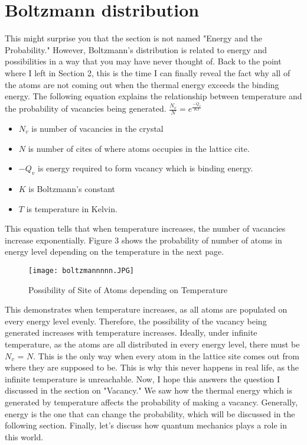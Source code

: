 \documentclass{article}
\begin{document}
\section{Boltzmann distribution}
This might surprise you that the section is not named "Energy and the Probability." 
However, Boltzmann's distribution is related to energy and possibilities in a way that you may have never thought of. 
Back to the point where I left in Section 2, this is the time I can finally reveal the fact why all of the atoms are not coming out when the thermal energy exceeds the binding energy. 
The following equation explains the relationship between temperature and the probability of vacancies being generated. 
\LARGE
$\frac{N_v}{N} = e^\frac{-Q_v}{KT}\ $     
\\
\normalsize
\begin{itemize}
    \item $ N_v$ is number of vacancies in the crystal 
    \item $ N$ is number of cites of where atoms occupies in the lattice cite. 
    \item $-Q_v$ is energy required to form vacancy which is binding energy.
    \item $K$ is Boltzmann's constant 
    \item $T$ is temperature in Kelvin. 
\end{itemize}

This equation tells that when temperature increases, the number of vacancies increase exponentially. 
Figure 3 shows the probability of number of atoms in energy level depending on the temperature in the next page.
\\
\begin{figure}
    \centering
    \texttt{[image: boltzmannnnn.JPG]}
    \caption{Possibility of Site of Atoms depending on Temperature}
    \label{fig:l}
\end{figure}
This demonstrates when temperature increases, as all atoms are populated on every energy level evenly. Therefore, the possibility of the vacancy being generated increases with temperature increases. 
Ideally, under infinite temperature, as the atoms are all distributed in every energy level, there must be $N_v$ = $N$. 
This is the only way when every atom in the lattice site comes out from where they are supposed to be.
This is why this never happens in real life, as the infinite temperature is unreachable. 
Now, I hope this answers the question I discussed in the section on "Vacancy." 
We saw how the thermal energy which is generated by temperature affects the probability of making a vacancy. 
Generally, energy is the one that can change the probability, which will be discussed in the following section.
Finally, let's discuss how quantum mechanics plays a role in this world. 
\end{document}
